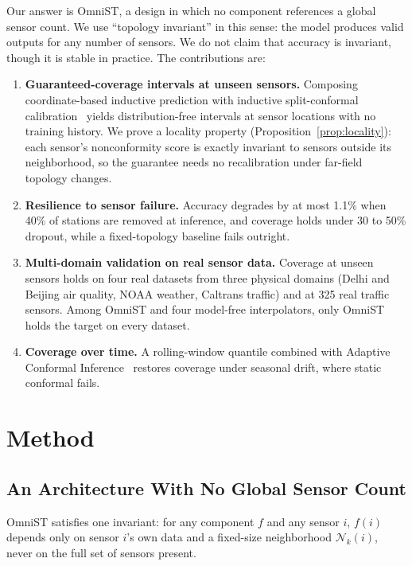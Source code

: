 \documentclass[journal]{IEEEtran}
\begin{document}
Our answer is OmniST, a design in which no component references a global sensor count. We use
``topology invariant'' in this sense: the model produces valid outputs for any number of sensors. We
do not claim that accuracy is invariant, though it is stable in practice. The contributions are:
\begin{enumerate}
\item \textbf{Guaranteed-coverage intervals at unseen sensors.} Composing coordinate-based inductive
prediction with inductive split-conformal calibration~\cite{conformalinductivegnn2024} yields
distribution-free intervals at sensor locations with no training history. We prove a locality
property (Proposition~\ref{prop:locality}): each sensor's nonconformity score is exactly invariant to
sensors outside its neighborhood, so the guarantee needs no recalibration under far-field topology
changes.
\item \textbf{Resilience to sensor failure.} Accuracy degrades by at most 1.1\% when 40\% of
stations are removed at inference, and coverage holds under 30 to 50\% dropout, while a
fixed-topology baseline fails outright.
\item \textbf{Multi-domain validation on real sensor data.} Coverage at unseen sensors holds on four
real datasets from three physical domains (Delhi and Beijing air quality, NOAA weather, Caltrans
traffic) and at 325 real traffic sensors. Among OmniST and four model-free interpolators, only
OmniST holds the target on every dataset.
\item \textbf{Coverage over time.} A rolling-window quantile combined with Adaptive Conformal
Inference~\cite{gibbs2021aci} restores coverage under seasonal drift, where static conformal fails.
\end{enumerate}

\section{Method}
\label{sec:architecture}

\subsection{An Architecture With No Global Sensor Count}

OmniST satisfies one invariant: for any component $f$ and any sensor $i$, $f(i)$ depends only on
sensor $i$'s own data and a fixed-size neighborhood $\mathcal{N}_k(i)$, never on the full set of
sensors present.
\end{document}
